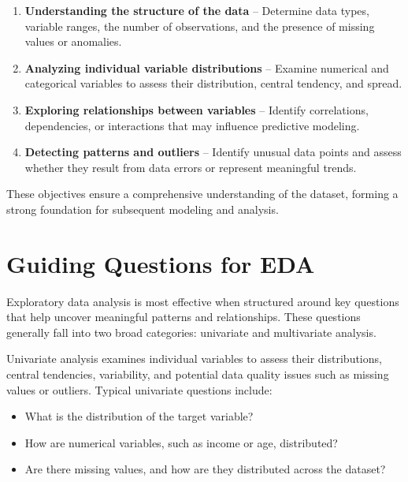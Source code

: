 \documentclass[
  11pt,
]{book}
\providecommand{\tightlist}{%
  \setlength{\itemsep}{0pt}\setlength{\parskip}{0pt}}
\theoremstyle{definition}
\theoremstyle{definition}
\theoremstyle{definition}
\theoremstyle{definition}
\theoremstyle{remark}
\begin{document}
\begin{enumerate}
\def\labelenumi{\arabic{enumi}.}
\tightlist
\item
  \textbf{Understanding the structure of the data} -- Determine data types, variable ranges, the number of observations, and the presence of missing values or anomalies.\\
\item
  \textbf{Analyzing individual variable distributions} -- Examine numerical and categorical variables to assess their distribution, central tendency, and spread.\\
\item
  \textbf{Exploring relationships between variables} -- Identify correlations, dependencies, or interactions that may influence predictive modeling.\\
\item
  \textbf{Detecting patterns and outliers} -- Identify unusual data points and assess whether they result from data errors or represent meaningful trends.
\end{enumerate}

These objectives ensure a comprehensive understanding of the dataset, forming a strong foundation for subsequent modeling and analysis.

\section{Guiding Questions for EDA}\label{guiding-questions-for-eda}

Exploratory data analysis is most effective when structured around key questions that help uncover meaningful patterns and relationships. These questions generally fall into two broad categories: univariate and multivariate analysis.

Univariate analysis examines individual variables to assess their distributions, central tendencies, variability, and potential data quality issues such as missing values or outliers. Typical univariate questions include:

\begin{itemize}
\tightlist
\item
  What is the distribution of the target variable?\\
\item
  How are numerical variables, such as income or age, distributed?\\
\item
  Are there missing values, and how are they distributed across the dataset?
\end{itemize}
\end{document}
